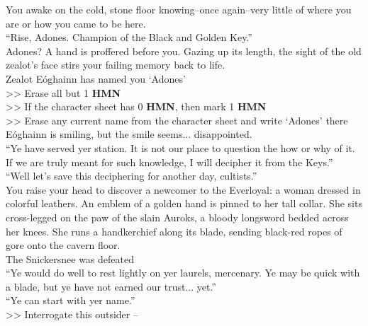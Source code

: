 You awake on the cold, stone floor knowing--once again--very little of where you are or how you came to be here.\\

“Rise, Adones. Champion of the Black and Golden Key.”\\

Adones? A hand is proffered before you. Gazing up its length, the sight of the old zealot’s face stirs your failing memory back to life.\\
 Zealot Eóghainn has named you ‘Adones’\\
>> Erase all but 1 \textbf{HMN}\\
>> If the character sheet has 0 \textbf{HMN}, then mark 1 \textbf{HMN}\\
>> Erase any current name from the character sheet and write ‘Adones’ there\\

Eóghainn is smiling, but the smile seems... disappointed.\\

“Ye have served yer station. It is not our place to question the how or why of it. If we are truly meant for such knowledge, I will decipher it from the Keys.”\\

“Well let’s save this deciphering for another day, cultists.”\\

You raise your head to discover a newcomer to the Everloyal: a woman dressed in colorful leathers. An emblem of a golden hand is pinned to her tall collar. She sits cross-legged on the paw of the slain Auroks, a bloody longsword bedded across her knees. She runs a handkerchief along its blade, sending black-red ropes of gore onto the cavern floor.\\
 The Snickersnee was defeated\\

“Ye would do well to rest lightly on yer laurels, mercenary. Ye may be quick with a blade, but ye have not earned our trust... yet.”\\

“Ye can start with yer name.”\\

>> Interrogate this outsider -- 